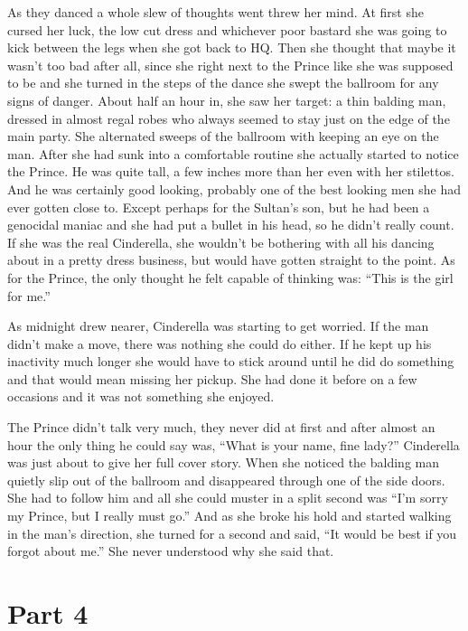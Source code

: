 \documentclass[11pt,letterpaper]{article}
\begin{document}
As they danced a whole slew of thoughts went threw her mind. At first she cursed her luck, the low cut dress and whichever poor bastard she was going to kick between the legs when she got back to HQ. Then she thought that maybe it wasn't too bad after all, since she right next to the Prince like she was supposed to be and she turned in the steps of the dance she swept the ballroom for any signs of danger. About half an hour in, she saw her target: a thin balding man, dressed in almost regal robes who always seemed to stay just on the edge of the main party. She alternated sweeps of the ballroom with keeping an eye on the man. After she had sunk into a comfortable routine she actually started to notice the Prince. He was quite tall, a few inches more than her even with her stilettos. And he was certainly good looking, probably one of the best looking men she had ever gotten close to. Except perhaps for the Sultan's son, but he had been a genocidal maniac and she had put a bullet in his head, so he didn't really count. If she was the real Cinderella, she wouldn't be bothering with all his dancing about in a pretty dress business, but would have gotten straight to the point. As for the Prince, the only thought he felt capable of thinking was: ``This is the girl for me.''

As midnight drew nearer, Cinderella was starting to get worried. If the man didn't make a move, there was nothing she could do either. If he kept up his inactivity much longer she would have to stick around until he did do something and that would mean missing her pickup. She had done it before on a few occasions and it was not something she enjoyed. 

The Prince didn't talk very much, they never did at first and after almost an hour the only thing he could say was, ``What is your name, fine lady?'' Cinderella was just about to give her full cover story. When she noticed the balding man quietly slip out of the ballroom and disappeared through one of the side doors. She had to follow him and all she could muster in a split second was ``I'm sorry my Prince, but I really must go.'' And as she broke his hold and started walking in the man's direction, she turned for a second and said, ``It would be best if you forgot about me.'' She never understood why she said that.

\section*{Part 4}
\end{document}

